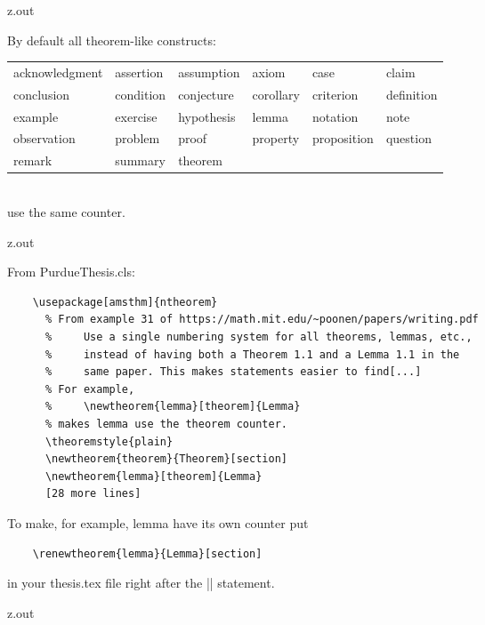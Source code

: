 \begin{VerbatimOut}{z.out}

By default all theorem-like constructs:\\[6pt]
\begin{tabular}{@{\hspace*{2\parindent}}llllll@{}}
acknowledgment& assertion&  assumption& axiom&      case&        claim\\
conclusion&     condition&  conjecture& corollary&  criterion&   definition\\
example&        exercise&   hypothesis& lemma&      notation&    note\\
observation&    problem&    proof&      property&   proposition& question\\
remark&         summary&    theorem\\
\end{tabular}
\mbox{}\\[6pt]
use the same counter.
\end{VerbatimOut}

\MyIO


\begin{VerbatimOut}{z.out}

From PurdueThesis.cls:
\begin{verbatim}
    \usepackage[amsthm]{ntheorem}
      % From example 31 of https://math.mit.edu/~poonen/papers/writing.pdf
      %     Use a single numbering system for all theorems, lemmas, etc.,
      %     instead of having both a Theorem 1.1 and a Lemma 1.1 in the
      %     same paper. This makes statements easier to find[...]
      % For example,
      %     \newtheorem{lemma}[theorem]{Lemma}
      % makes lemma use the theorem counter.
      \theoremstyle{plain}
      \newtheorem{theorem}{Theorem}[section]
      \newtheorem{lemma}[theorem]{Lemma}
      [28 more lines]
\end{verbatim}
To make,
for example,
lemma have its own counter put
\begin{verbatim}
    \renewtheorem{lemma}{Lemma}[section]
\end{verbatim}
in your thesis.tex file right after the || statement.
\end{VerbatimOut}

\MyIO


\begin{VerbatimOut}{z.out}

\begin{acknowledgment}
\end{acknowledgment}
\index{\verb+\begin{acknowledgment}+}
\end{VerbatimOut}

